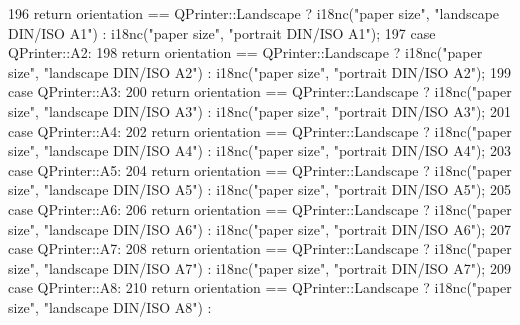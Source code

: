 \begin{DoxyCode}
196             \textcolor{keywordflow}{return}  orientation == QPrinter::Landscape ? i18nc(\textcolor{stringliteral}{"paper size"}, \textcolor{stringliteral}{"landscape DIN/ISO A1"}) : 
      i18nc(\textcolor{stringliteral}{"paper size"}, \textcolor{stringliteral}{"portrait DIN/ISO A1"});
197         \textcolor{keywordflow}{case} QPrinter::A2:
198             \textcolor{keywordflow}{return}  orientation == QPrinter::Landscape ? i18nc(\textcolor{stringliteral}{"paper size"}, \textcolor{stringliteral}{"landscape DIN/ISO A2"}) : 
      i18nc(\textcolor{stringliteral}{"paper size"}, \textcolor{stringliteral}{"portrait DIN/ISO A2"});
199         \textcolor{keywordflow}{case} QPrinter::A3:
200             \textcolor{keywordflow}{return}  orientation == QPrinter::Landscape ? i18nc(\textcolor{stringliteral}{"paper size"}, \textcolor{stringliteral}{"landscape DIN/ISO A3"}) : 
      i18nc(\textcolor{stringliteral}{"paper size"}, \textcolor{stringliteral}{"portrait DIN/ISO A3"});
201         \textcolor{keywordflow}{case} QPrinter::A4:
202             \textcolor{keywordflow}{return}  orientation == QPrinter::Landscape ? i18nc(\textcolor{stringliteral}{"paper size"}, \textcolor{stringliteral}{"landscape DIN/ISO A4"}) : 
      i18nc(\textcolor{stringliteral}{"paper size"}, \textcolor{stringliteral}{"portrait DIN/ISO A4"});
203         \textcolor{keywordflow}{case} QPrinter::A5:
204             \textcolor{keywordflow}{return}  orientation == QPrinter::Landscape ? i18nc(\textcolor{stringliteral}{"paper size"}, \textcolor{stringliteral}{"landscape DIN/ISO A5"}) : 
      i18nc(\textcolor{stringliteral}{"paper size"}, \textcolor{stringliteral}{"portrait DIN/ISO A5"});
205         \textcolor{keywordflow}{case} QPrinter::A6:
206             \textcolor{keywordflow}{return}  orientation == QPrinter::Landscape ? i18nc(\textcolor{stringliteral}{"paper size"}, \textcolor{stringliteral}{"landscape DIN/ISO A6"}) : 
      i18nc(\textcolor{stringliteral}{"paper size"}, \textcolor{stringliteral}{"portrait DIN/ISO A6"});
207         \textcolor{keywordflow}{case} QPrinter::A7:
208             \textcolor{keywordflow}{return}  orientation == QPrinter::Landscape ? i18nc(\textcolor{stringliteral}{"paper size"}, \textcolor{stringliteral}{"landscape DIN/ISO A7"}) : 
      i18nc(\textcolor{stringliteral}{"paper size"}, \textcolor{stringliteral}{"portrait DIN/ISO A7"});
209         \textcolor{keywordflow}{case} QPrinter::A8:
210             \textcolor{keywordflow}{return}  orientation == QPrinter::Landscape ? i18nc(\textcolor{stringliteral}{"paper size"}, \textcolor{stringliteral}{"landscape DIN/ISO A8"}) : 

\end{DoxyCode}
